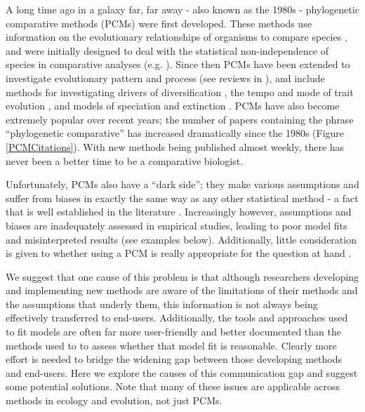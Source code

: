 \documentclass[a4paper,12pt]{article}
\begin{document}
A long time ago in a galaxy far, far away - also known as the 1980s - phylogenetic comparative methods (PCMs) were first developed. 
These methods use information on the evolutionary relationships of organisms to compare species \citep{harvey1991comparative}, and were initially designed to deal with the statistical non-independence of species in comparative analyses (e.g. \citealp{felsenstein1985phylogenies,grafen1989phylogenetic}).  
Since then PCMs have been extended to investigate evolutionary pattern and process (see reviews in \citealp{o2012evolutionary, pennell2013integrative}), and include methods for investigating drivers of diversification \citep[e.g.][]{maddison2007estimating}, the tempo and mode of trait evolution \citep[e.g.][]{o2012evolutionary}, and models of speciation and extinction \citep[e.g.][]{nee1994extinction}. 
PCMs have also become extremely popular over recent years; the number of papers containing the phrase ``phylogenetic comparative'' has increased dramatically since the 1980s (Figure \ref{PCMCitations}). 
With new methods being published almost weekly, there has never been a better time to be a comparative biologist.

Unfortunately, PCMs also have a ``dark side''; they make various assumptions and suffer from biases in exactly the same way as any other statistical method - a fact that is well established in the literature \citep[e.g.][]{freckleton2009seven,boettiger2012your,losos2011seeing,blomberg2012independent}.
Increasingly however, assumptions and biases are inadequately assessed in empirical studies, leading to poor model fits and misinterpreted results (see examples below).
Additionally, little consideration is given to whether using a PCM is really appropriate for the question at hand \citep{losos2011seeing,westoby1995misinterpreting}. 

We suggest that one cause of this problem is that although researchers developing and implementing new methods are aware of the limitations of their methods and the assumptions that underly them, this information is not always being effectively transferred to end-users.
Additionally, the tools and approaches used to fit models are often far more user-friendly and better documented than the methods used to to assess whether that model fit is reasonable. 
Clearly more effort is needed to bridge the widening gap between those developing methods and end-users. 
Here we explore the causes of this communication gap and suggest some potential solutions.
Note that many of these issues are applicable across methods in ecology and evolution, not just PCMs.
\end{document}
